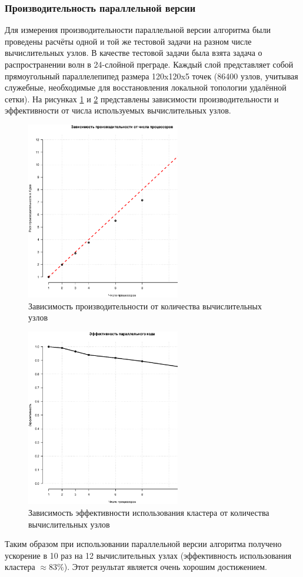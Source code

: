 \subsubsection{Производительность параллельной версии}
Для измерения производительности параллельной версии алгоритма были проведены расчёты одной и той же тестовой задачи на разном числе вычислительных узлов. В качестве тестовой задачи была взята задача о распространении волн в 24-слойной преграде. Каждый слой представляет собой прямоугольный параллелепипед размера 120x120x5 точек (86400 узлов, учитывая служебные, необходимые для восстановления локальной топологии удалённой сетки). На рисунках \ref{pic:gcm_boost} и \ref{pic:gcm_efficiency} представлены зависимости производительности и эффективности от числа используемых вычислительных узлов.
\begin{figure}[htp]
\centering
\includegraphics[width=0.6\textwidth]{eps/gcm3d-boost.eps}
\caption{Зависимость производительности от количества вычислительных узлов}
\label{pic:gcm_boost}
\end{figure}
\begin{figure}[htp]
\centering
\includegraphics[width=0.6\textwidth]{eps/gcm3d-efficiency.eps}
\caption{Зависимость эффективности использования кластера от количества вычислительных узлов}
\label{pic:gcm_efficiency}
\end{figure}
Таким образом при использовании параллельной версии алгоритма получено ускорение в 10 раз на 12 вычислительных узлах (эффективность использования кластера $\approx 83\%$). Этот результат является очень хорошим достижением.
